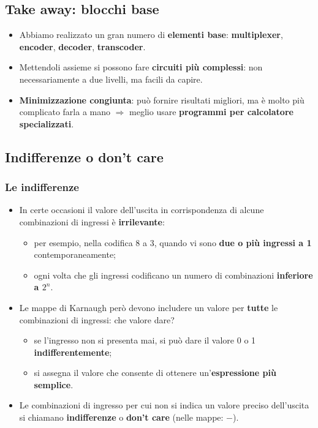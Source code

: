 \documentclass[12pt, a4paper]{article}
\begin{document}
\subsection{Take away: blocchi base}
\begin{itemize}
    \item Abbiamo realizzato un gran numero di \textbf{elementi base}: \textbf{multiplexer}, \textbf{encoder}, \textbf{decoder}, \textbf{transcoder}.
    \item Mettendoli assieme si possono fare \textbf{circuiti più complessi}: non necessariamente a due livelli, ma facili da capire.
    \item \textbf{Minimizzazione congiunta}: può fornire risultati migliori, ma è molto più complicato farla a mano $\Rightarrow$ meglio usare \textbf{programmi per calcolatore specializzati}.
\end{itemize}

\subsection{Indifferenze o don't care}

\subsubsection{Le indifferenze}
\begin{itemize}
    \item In certe occasioni il valore dell'uscita in corrispondenza di alcune combinazioni di ingressi è \textbf{irrilevante}:
    \begin{itemize}
        \item per esempio, nella codifica 8 a 3, quando vi sono \textbf{due o più ingressi a 1} contemporaneamente;
        \item ogni volta che gli ingressi codificano un numero di combinazioni \textbf{inferiore a $2^n$}.
    \end{itemize}
    \item Le mappe di Karnaugh però devono includere un valore per \textbf{tutte} le combinazioni di ingressi: che valore dare?
    \begin{itemize}
        \item se l'ingresso non si presenta mai, si può dare il valore 0 o 1 \textbf{indifferentemente};
        \item si assegna il valore che consente di ottenere un'\textbf{espressione più semplice}.
    \end{itemize}
    \item Le combinazioni di ingresso per cui non si indica un valore preciso dell'uscita si chiamano \textcolor{blue!70!black}{\textbf{indifferenze}} o \textcolor{blue!70!black}{\textbf{don't care}} (nelle mappe: $-$).
\end{itemize}
\end{document}

